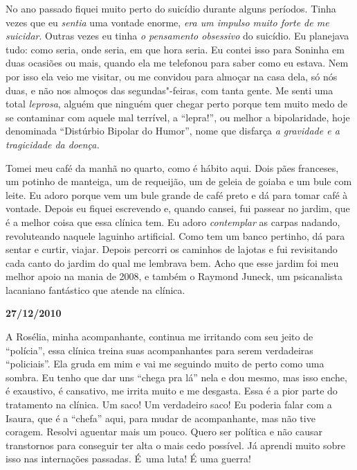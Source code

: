 No ano passado fiquei muito perto do suicídio durante alguns períodos.
Tinha vezes que eu \emph{sentia} uma vontade enorme, \emph{era um
impulso muito forte de me suicidar}. Outras vezes eu tinha \emph{o
pensamento obsessivo}\textbf{} do suicídio. Eu planejava tudo: como
seria, onde seria, em que hora seria. Eu contei isso para Soninha em
duas ocasiões ou mais, quando ela me telefonou para saber como eu
estava. Nem por isso ela veio me visitar, ou me convidou para almoçar na
casa dela, só nós duas, e não nos almoços das segundas"-feiras, com tanta
gente. Me senti uma total \emph{leprosa}, alguém que ninguém quer chegar
perto porque tem muito medo de se contaminar com aquele mal terrível, a
``lepra!'', ou melhor a bipolaridade, hoje denominada ``Distúrbio
Bipolar do Humor'', nome que disfarça \emph{a gravidade e a tragicidade
da doença.}

Tomei meu café da manhã no quarto, como é hábito aqui. Dois pães
franceses, um potinho de manteiga, um de requeijão, um de geleia de
goiaba e um bule com leite. Eu adoro porque vem um bule grande de café
preto e dá para tomar café à vontade. Depois eu fiquei escrevendo e,
quando cansei, fui passear no jardim, que é a melhor coisa que essa
clínica tem. Eu adoro \emph{contemplar} as carpas nadando, revoluteando
naquele laguinho artificial. Como tem um banco pertinho, dá para sentar
e curtir, viajar. Depois percorri os caminhos de lajotas e fui
revisitando cada canto do jardim do qual me lembrava bem. Acho que esse
jardim foi meu melhor apoio na mania de 2008, e também o Raymond Juneck,
um psicanalista lacaniano fantástico que atende na clínica.

\begin{flushright}\textbf{27/12/2010}\end{flushright}


A Rosélia, minha acompanhante, continua me irritando com seu jeito de
``polícia'', essa clínica treina suas acompanhantes para serem
verdadeiras ``policiais''. Ela gruda em mim e vai me seguindo muito de
perto como uma sombra. Eu tenho que dar uns ``chega pra lá'' nela e dou
mesmo, mas isso enche, é exaustivo, é cansativo, me irrita muito e me
desgasta. Essa é a pior parte do tratamento na clínica. Um saco! Um
verdadeiro saco! Eu poderia falar com a Isaura, que é a ``chefa'' aqui,
para mudar de acompanhante, mas não tive coragem. Resolvi aguentar mais
um pouco. Quero ser política e não causar transtornos para conseguir ter
alta o mais cedo possível. Já aprendi muito sobre isso nas internações
passadas. É~uma luta! É uma guerra!

